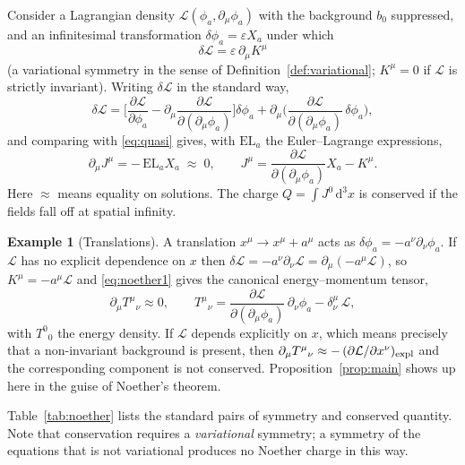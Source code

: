 \documentclass[11pt,a4paper,openany]{book}
\theoremstyle{definition}
\newtheorem{example}{Example}[chapter]
\theoremstyle{plain}
\theoremstyle{remark}
\newcommand{\dd}{\mathrm{d}}
\newcommand{\pd}[2]{\frac{\partial #1}{\partial #2}}
\newcommand{\eps}{\varepsilon}
\newcommand{\weakeq}{\approx}
\begin{document}
Consider a Lagrangian density $\mathcal L(\phi_a,\partial_\mu\phi_a)$ with
the background $b_0$ suppressed, and an infinitesimal transformation
$\delta\phi_a=\eps X_a$ under which
\begin{equation}\label{eq:quasi}
  \delta\mathcal L=\eps\,\partial_\mu K^\mu
\end{equation}
(a variational symmetry in the sense of Definition~\ref{def:variational};
$K^\mu=0$ if $\mathcal L$ is strictly invariant). Writing $\delta\mathcal L$
in the standard way,
\begin{equation}
  \delta\mathcal L
  =\Big[\pd{\mathcal L}{\phi_a}-\partial_\mu\pd{\mathcal L}{(\partial_\mu\phi_a)}\Big]\delta\phi_a
   +\partial_\mu\Big(\pd{\mathcal L}{(\partial_\mu\phi_a)}\,\delta\phi_a\Big),
\end{equation}
and comparing with \eqref{eq:quasi} gives, with $\mathrm{EL}_a$ the
Euler--Lagrange expressions,
\begin{equation}\label{eq:noether1}
  \partial_\mu J^\mu=-\,\mathrm{EL}_a X_a\;\weakeq\;0,
  \qquad
  J^\mu=\pd{\mathcal L}{(\partial_\mu\phi_a)}X_a-K^\mu .
\end{equation}
Here $\weakeq$ means equality on solutions. The charge
$Q=\int J^0\,\dd^3x$ is conserved if the fields fall off at spatial infinity.

\begin{example}[Translations]\label{ex:translations}
A translation $x^\mu\to x^\mu+a^\mu$ acts as $\delta\phi_a=-a^\nu\partial_\nu\phi_a$.
If $\mathcal L$ has no explicit dependence on $x$ then
$\delta\mathcal L=-a^\nu\partial_\nu\mathcal L=\partial_\mu(-a^\mu\mathcal L)$,
so $K^\mu=-a^\mu\mathcal L$ and \eqref{eq:noether1} gives the canonical
energy--momentum tensor,
\begin{equation}
  \partial_\mu T^\mu{}_\nu\weakeq0,\qquad
  T^\mu{}_\nu=\pd{\mathcal L}{(\partial_\mu\phi_a)}\,\partial_\nu\phi_a-\delta^\mu_\nu\,\mathcal L,
\end{equation}
with $T^0{}_0$ the energy density. If $\mathcal L$ depends explicitly on $x$,
which means precisely that a non-invariant background is present, then
$\partial_\mu T^\mu{}_\nu\weakeq-\,(\partial\mathcal L/\partial x^\nu)_{\rm expl}$
and the corresponding component is not conserved. Proposition~\ref{prop:main}
shows up here in the guise of Noether's theorem.
\end{example}

Table~\ref{tab:noether} lists the standard pairs of symmetry and conserved
quantity. Note that conservation requires a \emph{variational} symmetry; a
symmetry of the equations that is not variational produces no Noether charge
in this way.
\end{document}
